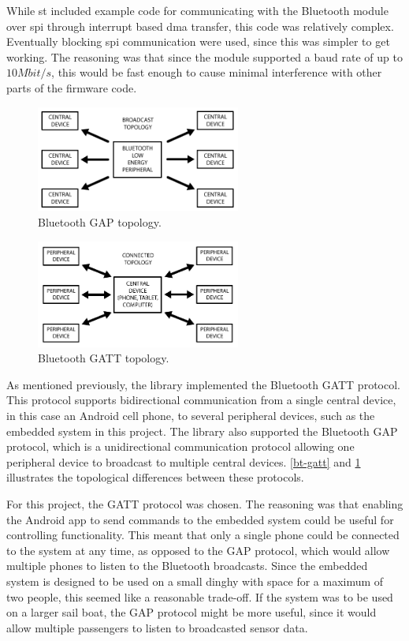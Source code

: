 While \gls{st} included example code for communicating with the Bluetooth module over \gls{spi} through interrupt based \gls{dma} transfer, this code was relatively complex. Eventually blocking \gls{spi} communication were used, since this was simpler to get working. The reasoning was that since the module supported a baud rate of up to $10 Mbit/s$, this would be fast enough to cause minimal interference with other parts of the firmware code.

\begin{figure}[H]
\centering
\includegraphics[width=0.6\textwidth]{Figures/bt_gap.png}
\caption{Bluetooth GAP topology.}
\label{bt-gap}
\end{figure}

\begin{figure}[H]
\centering
\includegraphics[width=0.6\textwidth]{Figures/bt_gatt.png}
\caption{Bluetooth GATT topology.}
\label{bt-gatt}
\end{figure}

As mentioned previously, the library implemented the Bluetooth GATT protocol. This protocol supports bidirectional communication from a single central device, in this case an Android cell phone, to several peripheral devices, such as the embedded system in this project. The library also supported the Bluetooth GAP protocol, which is a unidirectional communication protocol allowing one peripheral device to broadcast to multiple central devices. \autoref{bt-gatt} and \ref{bt-gap} illustrates the topological differences between these protocols.

For this project, the GATT protocol was chosen. The reasoning was that enabling the Android app to send commands to the embedded system could be useful for controlling functionality. This meant that only a single phone could be connected to the system at any time, as opposed to the GAP protocol, which would allow multiple phones to listen to the Bluetooth broadcasts. Since the embedded system is designed to be used on a small dinghy with space for a maximum of two people, this seemed like a reasonable trade-off. If the system was to be used on a larger sail boat, the GAP protocol might be more useful, since it would allow multiple passengers to listen to broadcasted sensor data.

